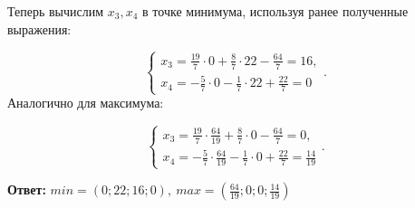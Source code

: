 \documentclass[11pt]{article}
\begin{document}
\hfill

Теперь вычислим $x_3, x_4$ в точке минимума, используя ранее полученные выражения:

\begin{equation*}
\begin{cases}
x_3 =  \frac{19}7\cdot{}0 + \frac87\cdot{}22  -\frac{64}7  =  16,\\ 
x_4 = -\frac57\cdot{}0 - \frac17\cdot{}22 +  \frac{22}7 = 0
\end{cases}.
\end{equation*}
Аналогично для максимума:

\begin{equation*}
\begin{cases}
x_3 =  \frac{19}7\cdot{}\frac{64}{19} + \frac87\cdot{}0  - \frac{64}7  =  0,\\ 
x_4 = -\frac57\cdot{}\frac{64}{19} - \frac17\cdot{}0 +  \frac{22}7 = \frac{14}{19}
\end{cases}.
\end{equation*}

\hfill

\textbf{Ответ: } $min = (0; 22; 16; 0),\  max = (\frac{64}{19}; 0; 0;  \frac{14}{19})$
\end{document}
